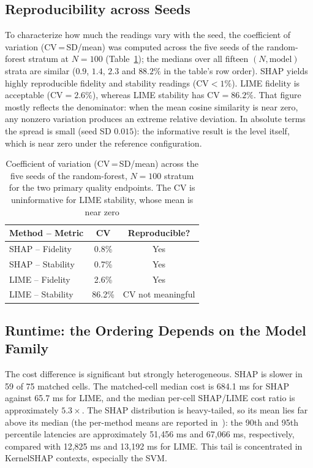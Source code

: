 \documentclass{cleiej}
\begin{document}
\subsection{Reproducibility across Seeds}

To characterize how much the readings vary with the seed, the coefficient
of variation (CV\,=\,SD/mean) was computed across the five seeds of the
random-forest stratum at $N=100$ (Table~\ref{tab:cv_reproducibility}); the
medians over all fifteen $(N, \mathrm{model})$ strata are similar ($0.9$,
$1.4$, $2.3$ and $88.2\%$ in the table's row order). SHAP yields highly
reproducible fidelity and stability readings ($\mathrm{CV}<1\%$). LIME
fidelity is acceptable ($\mathrm{CV}=2.6\%$), whereas LIME stability has
$\mathrm{CV}=86.2\%$. That figure mostly reflects the denominator: when the
mean cosine similarity is near zero, any nonzero variation produces an
extreme relative deviation. In absolute terms the spread is small (seed SD
$0.015$): the informative result is the level itself, which is near zero
under the reference configuration.

\begin{table}[htb]
\centering
\caption{Coefficient of variation (CV\,=\,SD/mean) across the five seeds of
the random-forest, $N=100$ stratum for the two primary quality endpoints.
The CV is uninformative for LIME stability, whose mean is near zero}
\label{tab:cv_reproducibility}
\begin{tabular}{lcc}
\toprule
Method -- Metric    & CV & Reproducible? \\
\midrule
SHAP -- Fidelity    & 0.8\%     & Yes \\
SHAP -- Stability   & 0.7\%     & Yes \\
LIME -- Fidelity    & 2.6\%     & Yes \\
LIME -- Stability   & 86.2\%    & CV not meaningful \\
\bottomrule
\end{tabular}
\end{table}

\subsection{Runtime: the Ordering Depends on the Model Family}
\label{sec:runtime}

The cost difference is significant but strongly heterogeneous. SHAP is
slower in 59 of 75 matched cells. The matched-cell median cost is 684.1 ms
for SHAP against 65.7 ms for LIME, and the median per-cell SHAP/LIME cost
ratio is approximately $5.3\times$. The SHAP distribution is heavy-tailed,
so its mean lies far above its median (the per-method means are reported
in~\cite{herrera2026framework}): the 90th and 95th percentile latencies are
approximately 51,456 ms and 67,066 ms, respectively, compared with
12,825 ms and 13,192 ms for LIME. This tail is concentrated in KernelSHAP
contexts, especially the SVM.
\end{document}
